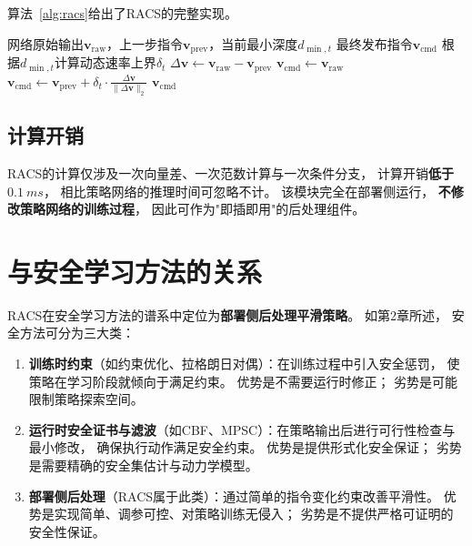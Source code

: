 算法~\ref{alg:racs}给出了RACS的完整实现。

\begin{algorithm}[htbp]
\caption{RACS动态速率限制控制平滑器}
\label{alg:racs}
\begin{algorithmic}[1]
\Require 网络原始输出$\mathbf{v}_{\text{raw}}$，上一步指令$\mathbf{v}_{\text{prev}}$，当前最小深度$d_{\min,t}$
\Ensure 最终发布指令$\mathbf{v}_{\text{cmd}}$
\State 根据$d_{\min,t}$计算动态速率上界$\delta_t$ 
\State $\Delta \mathbf{v} \leftarrow \mathbf{v}_{\text{raw}} - \mathbf{v}_{\text{prev}}$
  \State $\mathbf{v}_{\text{cmd}} \leftarrow \mathbf{v}_{\text{raw}}$ 
\Else
  \State $\mathbf{v}_{\text{cmd}} \leftarrow \mathbf{v}_{\text{prev}} + \delta_t \cdot \frac{\Delta \mathbf{v}}{\|\Delta \mathbf{v}\|_2}$ 
\EndIf
\State \Return $\mathbf{v}_{\text{cmd}}$
\end{algorithmic}
\end{algorithm}

\subsection{计算开销}

RACS的计算仅涉及一次向量差、一次范数计算与一次条件分支，
计算开销\textbf{低于$\SI{0.1}{ms}$}，
相比策略网络的推理时间可忽略不计。
该模块完全在部署侧运行，
\textbf{不修改策略网络的训练过程}，
因此可作为"即插即用"的后处理组件。


\section{与安全学习方法的关系}

RACS在安全学习方法的谱系中定位为\textbf{部署侧后处理平滑策略}。
如第2章所述，
安全方法可分为三大类：

\begin{enumerate}
  \item \textbf{训练时约束}（如约束优化、拉格朗日对偶）：在训练过程中引入安全惩罚，
    使策略在学习阶段就倾向于满足约束。
    优势是不需要运行时修正；
    劣势是可能限制策略探索空间。
     \item \textbf{运行时安全证书与滤波}（如CBF\cite{Cheng2019RLwithCBF}、MPSC\cite{Wabersich2018MPSC}）：在策略输出后进行可行性检查与最小修改，
    确保执行动作满足安全约束。
    优势是提供形式化安全保证；
    劣势是需要精确的安全集估计与动力学模型。
     \item \textbf{部署侧后处理}（RACS属于此类）：通过简单的指令变化约束改善平滑性。
    优势是实现简单、调参可控、对策略训练无侵入；
    劣势是不提供严格可证明的安全性保证。
     \end{enumerate}

